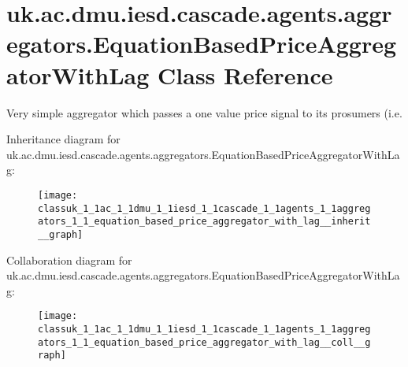 \hypertarget{classuk_1_1ac_1_1dmu_1_1iesd_1_1cascade_1_1agents_1_1aggregators_1_1_equation_based_price_aggregator_with_lag}{\section{uk.\-ac.\-dmu.\-iesd.\-cascade.\-agents.\-aggregators.\-Equation\-Based\-Price\-Aggregator\-With\-Lag Class Reference}
\label{classuk_1_1ac_1_1dmu_1_1iesd_1_1cascade_1_1agents_1_1aggregators_1_1_equation_based_price_aggregator_with_lag}
}


Very simple aggregator which passes a one value price signal to its prosumers (i.\-e.  




Inheritance diagram for uk.\-ac.\-dmu.\-iesd.\-cascade.\-agents.\-aggregators.\-Equation\-Based\-Price\-Aggregator\-With\-Lag\-:\nopagebreak
\begin{figure}[H]
\begin{center}
\leavevmode
\texttt{[image: classuk\_1\_1ac\_1\_1dmu\_1\_1iesd\_1\_1cascade\_1\_1agents\_1\_1aggregators\_1\_1\_equation\_based\_price\_aggregator\_with\_lag\_\_inherit\_\_graph]}
\end{center}
\end{figure}


Collaboration diagram for uk.\-ac.\-dmu.\-iesd.\-cascade.\-agents.\-aggregators.\-Equation\-Based\-Price\-Aggregator\-With\-Lag\-:\nopagebreak
\begin{figure}[H]
\begin{center}
\leavevmode
\texttt{[image: classuk\_1\_1ac\_1\_1dmu\_1\_1iesd\_1\_1cascade\_1\_1agents\_1\_1aggregators\_1\_1\_equation\_based\_price\_aggregator\_with\_lag\_\_coll\_\_graph]}
\end{center}
\end{figure}
